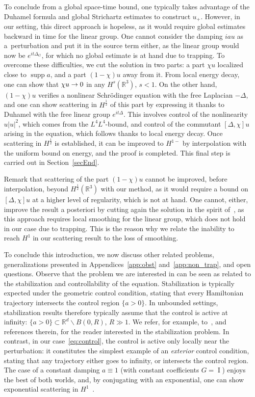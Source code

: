 \documentclass[10pt]{amsart}
\theoremstyle{definition}\newtheorem{defi}[theo]{Definition}\newtheorem{rema}[theo]{Remark}\newtheorem{exam}[theo]{Example}\newtheorem{exem}[theo]{Example}\newtheorem{nota}[theo]{Notation}
\newcommand*\R{\mathbb{R}}
\DeclareMathOperator{\I}{I}
\DeclareMathOperator{\supp}{supp}
\newcounter{setofstep}
\newcounter{step}[setofstep]
\renewcommand*{\to}{\mathchoice{\longrightarrow}{\rightarrow}{\rightarrow}{\rightarrow}}
\begin{document}
To conclude from a global space-time bound, one typically takes advantage of the Duhamel formula and global Strichartz estimates to construct $u_+$. However, in our setting, this direct approach is hopeless, as it would require global estimates backward in time for the linear group. One cannot consider the damping $iau$ as a~perturbation and put it in the source term either, as the linear group would now be $e^{it\Delta_G}$, for which no global estimate is at hand due to trapping. To overcome these difficulties, we cut the solution in two parts: a part $\chi u$ localized close to $\supp a$, and a part $(1-\chi) u$ away from it. From local energy decay, one can show that $\chi u \to 0$ in any $H^s(\R^3)$, $s<1$. On the other hand, $(1-\chi) u$ verifies a nonlinear Schr{\"o}dinger equation with the free Laplacian $-\Delta$, and one can show scattering in $H^{\frac 12}$ of this part by expressing it thanks to Duhamel with the free linear group $e^{it\Delta}$. This involves control of the nonlinearity $u|u|^2$, which comes from the $L^4 L^4$-bound, and control of the commutant $[\Delta, \chi]u$ arising in the equation, which follows thanks to local energy decay. Once scattering in $H^{\frac 12}$ is established, it can be improved to $H^{1-}$ by interpolation with the uniform bound on energy, and the proof is completed. This final step is carried out in Section~\ref{secEnd}.

Remark that scattering of the part $(1-\chi)u$ cannot be improved, before interpolation, beyond $H^{\frac 12}(\R^3)$ with our method, as it would require a bound on $[\Delta, \chi]u$ at a higher level of regularity, which is not at hand. One cannot, either, improve the result a posteriori by cutting again the solution in the spirit of~\cite{PV1}, as this approach requires local smoothing for the linear group, which does not hold in our case due to trapping. This is the reason why we relate the inability to reach $H^1$ in our scattering result to the loss of smoothing.

To conclude this introduction, we now discuss other related problems, generalizations presented in Appendices~\ref{app:obst} and~\ref{app:non_trap}, and open questions. Observe that the problem we are interested in can be seen as related to the stabilization and controllability of the equation. Stabilization is typically expected under the geometric control condition, stating that every Hamiltonian trajectory intersects the control region $\{ a > 0 \}$. In unbounded settings, stabilization results therefore typically assume that the control is active at infinity: $\{ a > 0 \}\subset \R^d \backslash B(0, R)$, $R\gg1$. We refer, for example, to~\cite{stab24, CaCoWe20,DeGeLe06, Lau10,BaMa23, RoZh10,YaNiChe21}, and references therein, for the reader interested in the stabilization problem. In contrast, in our case~\eqref{eq:control}, the control is active only locally near the perturbation: it constitutes the simplest example of an \emph{exterior} control condition, stating that any trajectory either goes to infinity, or intersects the control region. The case of a constant damping $a\equiv1$ (with constant coefficients $G=\I$) enjoys the best of both worlds, and, by conjugating with an exponential, one can show exponential scattering in $H^1$~\cite{Ta19}.
\end{document}
